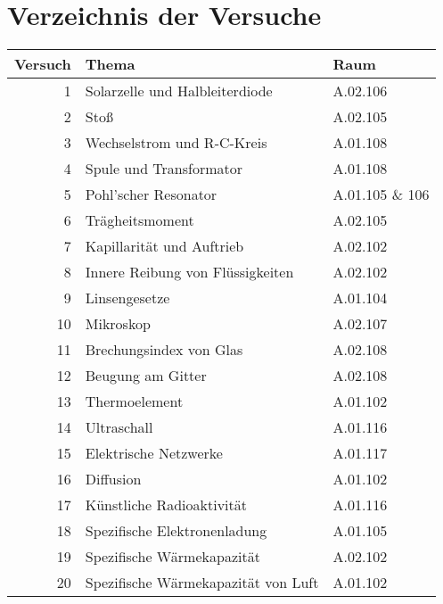 
\chapter{Verzeichnis der Versuche}

\begin{table}[h!]
 \centering
 \begin{tabular}{rll}
 \hline
 Versuch & Thema & Raum\\
 \hline
 1 & Solarzelle und Halbleiterdiode & A.02.106\\ 
 2 & Stoß & A.02.105\\
 3 & Wechselstrom und R-C-Kreis & A.01.108 \\ 
 4 & Spule und Transformator & A.01.108 \\ 
 5 & Pohl'scher Resonator & A.01.105 \& 106 \\
 6 & Trägheitsmoment & A.02.105\\
 7 & Kapillarität und Auftrieb & A.02.102 \\ 
 8 & Innere Reibung von Flüssigkeiten & A.02.102 \\ 
 9 & Linsengesetze & A.01.104 \\ 
 10 & Mikroskop & A.02.107 \\ 
 11 & Brechungsindex von Glas & A.02.108 \\ 
 12 & Beugung am Gitter & A.02.108\\ 
 13 & Thermoelement & A.01.102 \\ 
 14 & Ultraschall & A.01.116\\
 15 & Elektrische Netzwerke & A.01.117 \\ 
 16 & Diffusion & A.01.102\\ 
 17 & Künstliche Radioaktivität & A.01.116 \\ 
 18 & Spezifische Elektronenladung & A.01.105 \\ 
 19 & Spezifische Wärmekapazität & A.02.102 \\ 
 20 & Spezifische Wärmekapazität von Luft & A.01.102 \\ 
 \hline
 \end{tabular}
\end{table}
  